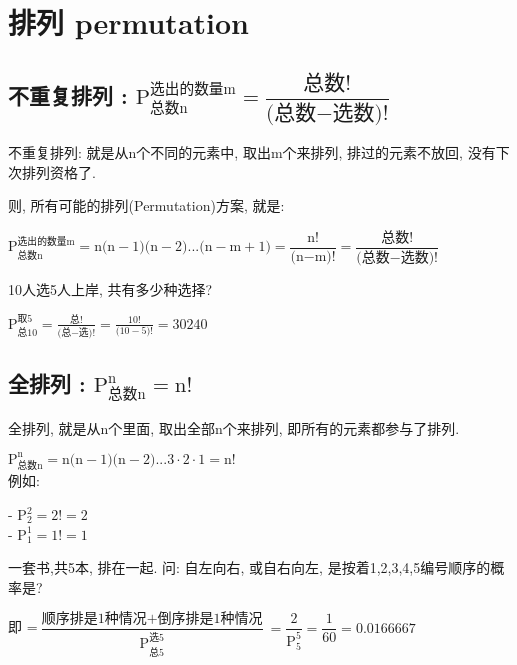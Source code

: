 \documentclass[UTF8]{ctexart}
\begin{document}
	
	
	
	\section{排列 permutation}
	
	
	
	
	
	\subsection{不重复排列 : $ 
		\text{P}_{\text{总数n}}^{\text{选出的数量m}}=\dfrac{\text{总数!}}{\text{(总数}-\text{选数)!}}	$}
	
	不重复排列: 就是从n个不同的元素中, 取出m个来排列, 排过的元素不放回, 没有下次排列资格了. 
	
	则, 所有可能的排列(Permutation)方案, 就是:	
	
	$
	\boxed{		\text{P}_{\text{总数n}}^{\text{选出的数量m}}=\text{n(n}-1\text{)(n}-2\text{)...(n}-\text{m}+1\text{)}=\dfrac{\text{n!}}{\text{(n}-\text{m)!}}=\dfrac{\text{总数!}}{\text{(总数}-\text{选数)!}} 
	}
	$
	
	\begin{myEnvSample}
		10人选5人上岸, 共有多少种选择?
		
		$
		\text{P}_{\text{总}10}^{\text{取}5}=\frac{\text{总!}}{\text{(总}-\text{选)!}}=\frac{10!}{\text{(}10-5\text{)!}}=30240
		$
	\end{myEnvSample}
	
	
	
	
	
	\subsection{全排列 : $
		\text{P}_{\text{总数n}}^{\text{n}}=\text{n!}$ }
	
	全排列, 就是从n个里面, 取出全部n个来排列, 即所有的元素都参与了排列.
	
	$ \boxed{
		\text{P}_{\text{总数n}}^{\text{n}}=\text{n(n}-1\text{)(n}-2\text{)}...3\cdot 2\cdot 1=\text{n!}
	}
	$ \\
	
	例如:
	
	- $	\text{P}_{2}^{2}=2!=2	$ \\	
	- $ \text{P}_{1}^{1}=1!=1$ \\
	
	\begin{myEnvSample}
		一套书,共5本, 排在一起. 问: 自左向右, 或自右向左, 是按着1,2,3,4,5编号顺序的概率是?
		
		即 =$
		\dfrac{\text{顺序排是1种情况}+\text{倒序排是1种情况}}{\text{P}_{\text{总}5}^{\text{选}5}}=\dfrac{2}{\text{P}_{5}^{5}}=\dfrac{1}{60}=0.0166667
		$
	\end{myEnvSample} 
	
\end{document}
